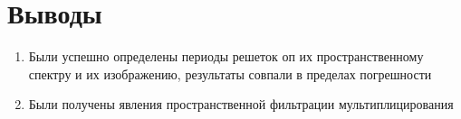 \documentclass[a4paper, 12pt]{article}
\begin{document}


 \section{Выводы}
\begin{enumerate}
    \item Были успешно определены периоды решеток оп их пространственному спектру и их изображению, результаты совпали в пределах погрешности
    \item Были получены явления пространственной фильтрации мультиплицирования

\end{enumerate}
\end{document}
